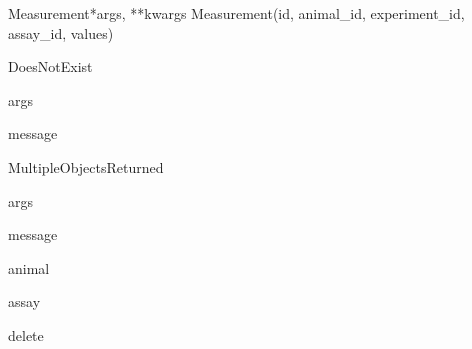 \documentclass[letterpaper,10pt,english]{sphinxmanual}
\begin{document}
\hypertarget{data.models.Measurement}{}\begin{classdesc}{Measurement}{*args, **kwargs}
Measurement(id, animal\_id, experiment\_id, assay\_id, values)

\hypertarget{data.models.Measurement.DoesNotExist}{}\begin{excdesc}{DoesNotExist}~

\hypertarget{data.models.Measurement.DoesNotExist.args}{}\begin{memberdesc}{args}\end{memberdesc}

\hypertarget{data.models.Measurement.DoesNotExist.message}{}\begin{memberdesc}{message}\end{memberdesc}
\end{excdesc}

\hypertarget{data.models.Measurement.MultipleObjectsReturned}{}\begin{excdesc}{MultipleObjectsReturned}~

\hypertarget{data.models.Measurement.MultipleObjectsReturned.args}{}\begin{memberdesc}{args}\end{memberdesc}

\hypertarget{data.models.Measurement.MultipleObjectsReturned.message}{}\begin{memberdesc}{message}\end{memberdesc}
\end{excdesc}

\hypertarget{data.models.Measurement.animal}{}\begin{memberdesc}[Measurement]{animal}\end{memberdesc}

\hypertarget{data.models.Measurement.assay}{}\begin{memberdesc}[Measurement]{assay}\end{memberdesc}

\hypertarget{data.models.Measurement.delete}{}\begin{methoddesc}[Measurement]{delete}{}\end{methoddesc}


\end{classdesc}
\end{document}
